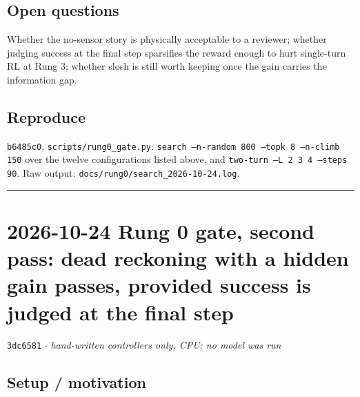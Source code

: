 \documentclass[11pt,a4paper]{article}
\newcommand{\commit}[1]{\texttt{\textcolor{commitgray}{#1}}}
\begin{document}
\subsection*{Open questions}

Whether the no-sensor story is physically acceptable to a reviewer; whether
judging success at the final step sparsifies the reward enough to hurt
single-turn RL at Rung 3; whether slosh is still worth keeping once the gain
carries the information gap.

\subsection*{Reproduce}

\commit{b6485c0}, \texttt{scripts/rung0\_gate.py}: \texttt{search --n-random
800 --topk 8 --n-climb 150} over the twelve configurations listed above, and
\texttt{two-turn --L 2 3 4 --steps 90}. Raw output:
\texttt{docs/rung0/search\_2026-10-24.log}.

\bigskip
\hrule
\bigskip

\section*{2026-10-24 \quad Rung 0 gate, second pass: dead reckoning with a
hidden gain passes, provided success is judged at the final step}

\commit{3dc6581} $\cdot$ \textit{hand-written controllers only, CPU; no model
was run}

\subsection*{Setup / motivation}
\end{document}

